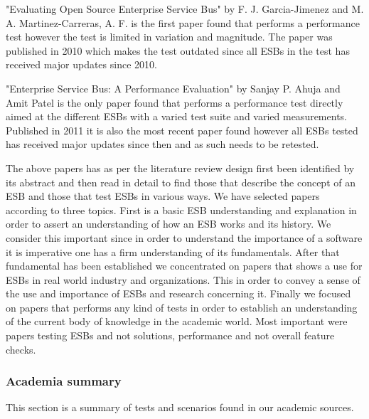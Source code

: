"Evaluating Open Source Enterprise Service Bus" \cite{Garcia2010} by F. J. Garcia-Jimenez and M. A. Martinez-Carreras, A. F. is the first paper found that performs a performance test however the test is limited in variation and magnitude. The paper was published in 2010 which makes the test outdated since all ESBs in the test has received major updates since 2010.


"Enterprise Service Bus: A Performance Evaluation" \cite{Sanjay2011} by Sanjay P. Ahuja and Amit Patel  is the only paper found that performs a performance test directly aimed at the different ESBs with a varied test suite and varied measurements. Published in 2011 it is also the most recent paper found however all ESBs tested has received major updates since then and as such needs to be retested.

The above papers has as per the literature review design first been identified by its abstract and then read in detail to find those that describe the concept of an ESB and those that test ESBs in various ways. We have selected papers according to three topics. First is a basic ESB understanding and explanation in order to assert an understanding of how an ESB works and its history. We consider this important since in order to understand the importance of a software it is imperative one has a firm understanding of its fundamentals. After that fundamental has been established we concentrated on papers that shows a use for ESBs in real world industry and organizations. This in order to convey a sense of the use and importance of ESBs and research concerning it.
Finally we focused on papers that performs any kind of tests in order to establish an understanding of the current body of knowledge in the academic world. Most important were papers testing ESBs and not solutions, performance and not overall feature checks.


\subsubsection{Academia summary}
This section is a summary of tests and scenarios found in our academic sources.

